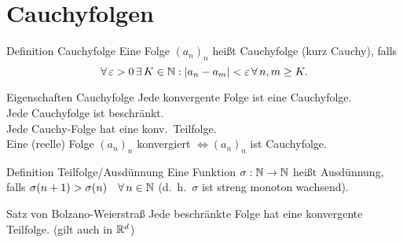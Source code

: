 \documentclass[main.tex]{subfiles}
\begin{document}
\section*{Cauchyfolgen}

\begin{karte}{Definition Cauchyfolge}
    Eine Folge \({(a_n)}_n\) heißt Cauchyfolge (kurz Cauchy), falls
    \[ \forall \varepsilon > 0 \,\exists K\in\N: 
    \abs{a_n-a_m} < \varepsilon \, \forall n,m\geq K. \]
\end{karte}
\begin{karte}{Eigenschaften Cauchyfolge}
    Jede konvergente Folge ist eine Cauchyfolge.\\
    Jede Cauchyfolge ist beschränkt.\\
    Jede Cauchy-Folge hat eine konv.\ Teilfolge.\\
    Eine (reelle) Folge \({(a_n)}_n\) konvergiert 
    \( \Leftrightarrow {(a_n)}_n \) ist Cauchyfolge.
\end{karte}
\begin{karte}{Definition Teilfolge/Ausdünnung}
    Eine Funktion \( \sigma:\mathbb{N} \rightarrow\mathbb{N} \) 
    heißt Ausdünnung, falls \( \sigma (n+1) 
    > \sigma(n) \quad \forall n\in\N \) 
    (d.\ h.\  \(\sigma \) ist streng monoton wachsend).
\end{karte}
\begin{karte}{Satz von Bolzano-Weierstraß}
    Jede beschränkte Folge hat eine konvergente Teilfolge. 
    (gilt auch in \( \mathbb{R}^d \))
\end{karte}
\end{document}
